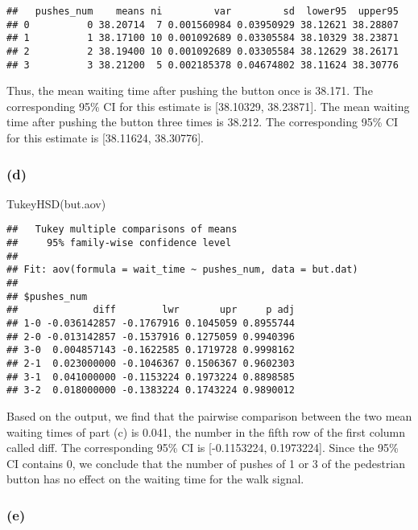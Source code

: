 \documentclass[
]{article}
\newenvironment{Shaded}{\begin{snugshade}}{\end{snugshade}}
\newcommand{\FunctionTok}[1]{\textcolor[rgb]{0.00,0.00,0.00}{#1}}
\newcommand{\NormalTok}[1]{#1}
\begin{document}
\begin{verbatim}
##   pushes_num    means ni         var         sd  lower95  upper95
## 0          0 38.20714  7 0.001560984 0.03950929 38.12621 38.28807
## 1          1 38.17100 10 0.001092689 0.03305584 38.10329 38.23871
## 2          2 38.19400 10 0.001092689 0.03305584 38.12629 38.26171
## 3          3 38.21200  5 0.002185378 0.04674802 38.11624 38.30776
\end{verbatim}

Thus, the mean waiting time after pushing the button once is 38.171. The
corresponding 95\% CI for this estimate is {[}38.10329, 38.23871{]}. The
mean waiting time after pushing the button three times is 38.212. The
corresponding 95\% CI for this estimate is {[}38.11624, 38.30776{]}.

\hypertarget{d}{%
\subsubsection{(d)}\label{d}}

\begin{Shaded}
\begin{Highlighting}[]
\FunctionTok{TukeyHSD}\NormalTok{(but.aov)}
\end{Highlighting}
\end{Shaded}

\begin{verbatim}
##   Tukey multiple comparisons of means
##     95% family-wise confidence level
## 
## Fit: aov(formula = wait_time ~ pushes_num, data = but.dat)
## 
## $pushes_num
##             diff        lwr       upr     p adj
## 1-0 -0.036142857 -0.1767916 0.1045059 0.8955744
## 2-0 -0.013142857 -0.1537916 0.1275059 0.9940396
## 3-0  0.004857143 -0.1622585 0.1719728 0.9998162
## 2-1  0.023000000 -0.1046367 0.1506367 0.9602303
## 3-1  0.041000000 -0.1153224 0.1973224 0.8898585
## 3-2  0.018000000 -0.1383224 0.1743224 0.9890012
\end{verbatim}

Based on the output, we find that the pairwise comparison between the
two mean waiting times of part (c) is 0.041, the number in the fifth row
of the first column called diff. The corresponding 95\% CI is
{[}-0.1153224, 0.1973224{]}. Since the 95\% CI contains 0, we conclude
that the number of pushes of 1 or 3 of the pedestrian button has no
effect on the waiting time for the walk signal.

\hypertarget{e}{%
\subsubsection{(e)}\label{e}}
\end{document}
